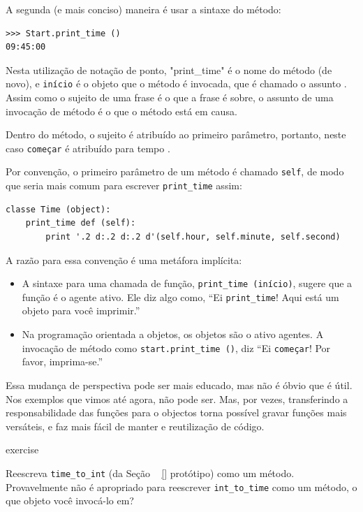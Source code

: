 \documentclass[10pt]{book}
\begin{document}
\begin{exercise}
\begin{v erbatim}
{A segunda (e mais conciso) maneira é usar a sintaxe do método:

\begin{verbatim}
>>> Start.print_time ()
09:45:00
\end{verbatim}
%
Nesta utilização de notação de ponto, \verbo "print_time" é o nome do
método (de novo), e {\tt início} é o objeto que o método é
invocada, que é chamado o assunto {\bf}. Assim como o
sujeito de uma frase é o que a frase é sobre, o assunto
de uma invocação de método é o que o método está em causa.

Dentro do método, o sujeito é atribuído ao primeiro
parâmetro, portanto, neste caso {\tt começar} é atribuído
para {tempo \tt}.

Por convenção, o primeiro parâmetro de um método é
chamado {\tt self}, de modo que seria mais comum para escrever
\Verb "print_time" assim:

\begin{verbatim}
classe Time (object):
    print_time def (self):
        print '.2 d:.2 d:.2 d'(self.hour, self.minute, self.second)
\end{verbatim}
%
A razão para essa convenção é uma metáfora implícita:

\begin{itemize}

\item A sintaxe para uma chamada de função, \verb "print_time (início)",
  sugere que a função é o agente ativo. Ele diz algo
  como, ``Ei \verb "print_time"! Aqui está um objeto para você imprimir.''

\item Na programação orientada a objetos, os objetos são o ativo
  agentes. A invocação de método como \verb "start.print_time ()", diz
  ``Ei {\tt começar}! Por favor, imprima-se.''

\end{itemize}

Essa mudança de perspectiva pode ser mais educado, mas não é óbvio
que é útil. Nos exemplos que vimos até agora, não pode
ser. Mas, por vezes, transferindo a responsabilidade das funções para o
objectos torna possível gravar funções mais versáteis, e faz
mais fácil de manter e reutilização de código.

\begin{} exercise
\label{convert}

Reescreva \verb "time_to_int" (da Seção ~ \ref {} protótipo) como um método.
Provavelmente não é apropriado para reescrever \verb "int_to_time" como um
método, o que objeto você invocá-lo em?


\end{}}
\end{v erbatim}
\end{exercise}
\end{document}
